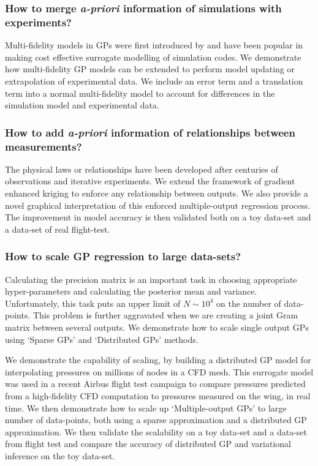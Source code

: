 \subsubsection*{How to merge \textit{a-priori} information of simulations with experiments?}
Multi-fidelity models in GPs were first introduced by \cite{kennedy2000predicting} and have been popular in making cost effective surrogate modelling of simulation codes. We demonstrate how multi-fidelity GP models can be extended to perform model updating or extrapolation of experimental data. We include an error term and a translation term into a normal multi-fidelity model to account for differences in the simulation model and experimental data. 

\subsubsection*{How to add \textit{a-priori} information of relationships between measurements?}
The physical laws or relationships have been developed after centuries of observations and iterative experiments. We extend the framework of gradient enhanced kriging to enforce any relationship between outputs. We also provide a novel graphical interpretation of this enforced multiple-output regression process. The improvement in model accuracy is then validated both on a toy data-set and a data-set of real flight-test.

\subsubsection*{How to scale GP regression to large data-sets?}
Calculating the precision matrix is an important task in choosing appropriate hyper-parameters and calculating the posterior mean and variance. Unfortunately, this task puts an upper limit of $N \sim 10^4$ on the number of data-points. This problem is further aggravated when we are creating a joint Gram matrix between several outputs. We demonstrate how to scale single output GPs using `Sparse GPs'  and `Distributed GPs' methods.

We demonstrate the capability of scaling, by building a distributed GP model for interpolating pressures on millions of nodes in a CFD mesh. This surrogate model was used in a recent Airbus flight test campaign to compare pressures predicted from a high-fidelity CFD computation to pressures measured on the wing, in real time. We then demonstrate how to scale up `Multiple-output GPs' to large number of data-points, both using a sparse approximation and a distributed GP approximation. We then validate the scalability on a toy data-set and a data-set from flight test and compare the accuracy of distributed GP and variational inference on the toy data-set. 


